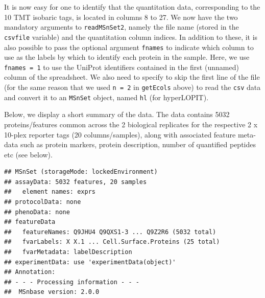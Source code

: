 It is now easy for one to identify that the quantitation data,
corresponding to the 10 TMT isobaric tags, is located in columns 8
to 27. We now have the two mandatory arguments to \texttt{readMSnSet2},
namely the file name (stored in the \texttt{csvfile} variable) and the
quantitation column indices. In addition to these, it is also possible
to pass the optional argument \texttt{fnames} to indicate which column to use
as the labels by which to identify each protein in the sample. Here,
we use \texttt{fnames = 1} to use the UniProt identifiers contained in the
first (unnamed) column of the spreadsheet. We also need to specify to
skip the first line of the file (for the same reason that we used 
\texttt{n = 2} in \texttt{getEcols} above) to read the \texttt{csv} data and convert it to an
\texttt{MSnSet} object, named \texttt{hl} (for hyperLOPIT).

\begin{knitrout}
\color{fgcolor}\begin{kframe}
\begin{alltt}
 \hlkwb{<-}   \hlstd{=} \hlopt{:}\hlstd{,}  \hlstd{=} \hlstd{,}  \hlstd{=} \hlstd{)}
\end{alltt}
\end{kframe}
\end{knitrout}

Below, we display a short summary of the data. The data contains 
5032 proteins/features common across the 2 biological replicates
for the respective 2 x 10-plex reporter tags (20
columns/samples), along with associated feature meta-data such as
protein markers, protein description, number of quantified peptides
etc (see below).


\begin{knitrout}
\color{fgcolor}\begin{kframe}
\begin{alltt}
\end{alltt}
\begin{verbatim}
## MSnSet (storageMode: lockedEnvironment)
## assayData: 5032 features, 20 samples 
##   element names: exprs 
## protocolData: none
## phenoData: none
## featureData
##   featureNames: Q9JHU4 Q9QXS1-3 ... Q9Z2R6 (5032 total)
##   fvarLabels: X X.1 ... Cell.Surface.Proteins (25 total)
##   fvarMetadata: labelDescription
## experimentData: use 'experimentData(object)'
## Annotation:  
## - - - Processing information - - -
##  MSnbase version: 2.0.0
\end{verbatim}
\end{kframe}
\end{knitrout}

